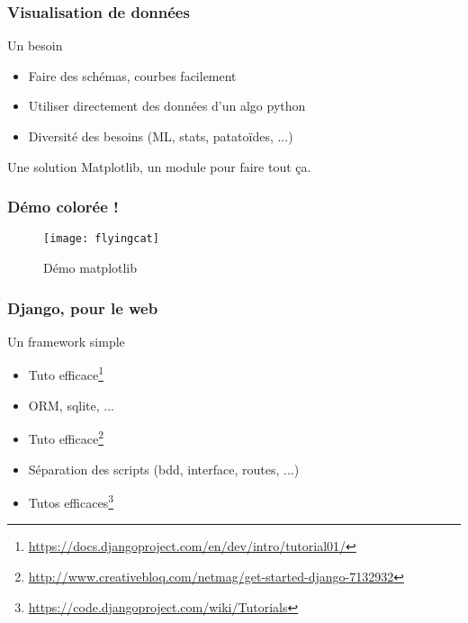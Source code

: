 \documentclass{beamer}
\begin{document}
\begin{frame}
  \frametitle{Visualisation de données}

  \begin{block}{Un besoin}
    \begin{itemize}
    \item Faire des schémas, courbes facilement
    \item Utiliser directement des données d'un algo python
    \item Diversité des besoins (ML, stats, patatoïdes, ...)
    \end{itemize}
  \end{block}

  \pause

  \begin{block}{Une solution}
    Matplotlib, un module pour faire tout ça.
  \end{block}
\end{frame}

\begin{frame}
  \frametitle{Démo colorée !}

  \begin{figure}[!h*]
    \centering
    \texttt{[image: flyingcat]}
    \caption{Démo matplotlib}
    \label{fig:matplotlibdemo}
  \end{figure}
\end{frame}

\begin{frame}
  \frametitle{Django, pour le web}

  \begin{block}{Un framework simple}
    \begin{itemize}
    \item Tuto
      efficace\footnote{\url{https://docs.djangoproject.com/en/dev/intro/tutorial01/}}
    \item ORM, sqlite, ...
    \item Tuto efficace\footnote{\url{http://www.creativebloq.com/netmag/get-started-django-7132932}}
    \item Séparation des scripts (bdd, interface, routes, ...)
    \item Tutos efficaces\footnote{\url{https://code.djangoproject.com/wiki/Tutorials}}
    \end{itemize}
  \end{block}
\end{frame}

\end{document}
